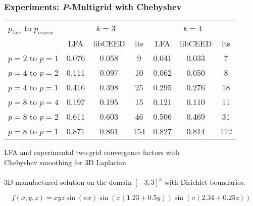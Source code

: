 \documentclass{beamer}
\begin{document}
\begin{frame}
\begin{center}
\frametitle{Experiments: {\textit P}-Multigrid with Chebyshev}

\begin{table}[ht!]
\begin{center}
\begin{tabular}{l ccc ccc}
  \toprule
  $p_{\text{fine}}$ to $p_{\text{coarse}}$  &  \multicolumn{3}{c}{$k = 3$}  &  \multicolumn{3}{c}{$k = 4$}  \\
                      &  LFA    &  libCEED  &  its  &  LFA   &  libCEED  &  its  \\
  \toprule
  $p = 2$ to $p = 1$  &  0.076  &  0.058    &  9    &  0.041 &  0.033    &  7    \\
  \midrule
  $p = 4$ to $p = 2$  &  0.111  &  0.097    &  10   &  0.062  &  0.050   &  8    \\
  $p = 4$ to $p = 1$  &  0.416  &  0.398    &  25   &  0.295  &  0.276   &  18   \\
  \midrule
  $p = 8$ to $p = 4$  &  0.197  &  0.195    &  15   &  0.121  &  0.110   &  11   \\
  $p = 8$ to $p = 2$  &  0.611  &  0.603    &  46   &  0.506  &  0.469   &  31   \\
  $p = 8$ to $p = 1$  &  0.871  &  0.861    &  154  &  0.827  &  0.814   &  112  \\
  \bottomrule
\end{tabular}
\end{center}
\label{table:two_grid_3d_chebyshev}
\end{table}
{\small LFA and experimental two-grid convergence factors with\\Chebyshev smoothing for 3D Laplacian}\\

~\\

3D manufactured solution on the domain $\left[ -3, 3 \right]^3$ with Dirichlet boundaries:

\begin{equation}
f \left( x, y, z \right) = x y z \sin \left( \pi x \right) \sin \left( \pi \left( 1.23 + 0.5 y \right) \right) \sin \left( \pi \left( 2.34 + 0.25 z \right) \right)
\end{equation}

\end{center}
\end{frame}

\end{document}

